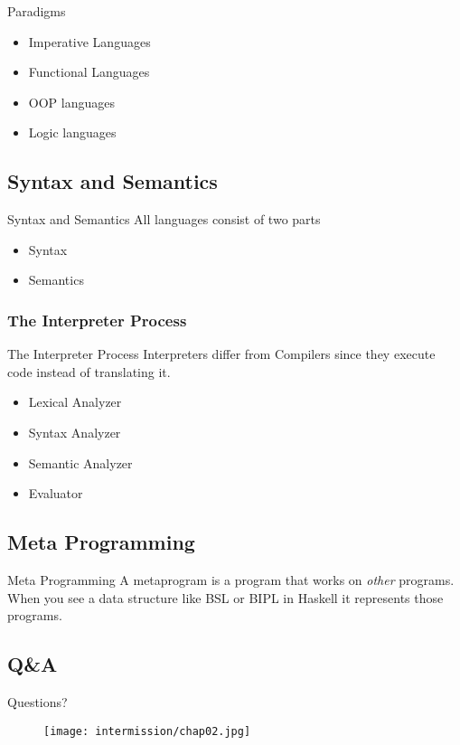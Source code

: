 \begin{frame}{Paradigms}
    \begin{itemize}[<+->]
        \item Imperative Languages
        \item Functional Languages
        \item OOP languages
        \item Logic languages
    \end{itemize}
\end{frame}

\subsection*{Syntax and Semantics}
\begin{frame}{Syntax and Semantics}
    All languages consist of two parts
    \begin{itemize}[<+->]
        \item Syntax
        \item Semantics
    \end{itemize}
\end{frame}

\subsubsection{The Interpreter Process}
\begin{frame}{The Interpreter Process}
    Interpreters differ from Compilers since they execute code instead of translating it.
    \begin{itemize}[<+->]
        \item Lexical Analyzer
        \item Syntax Analyzer
        \item Semantic Analyzer
        \item Evaluator
    \end{itemize}
\end{frame}

\subsection{Meta Programming}
\begin{frame}{Meta Programming}
    A metaprogram is a program that works on \textit{other} programs.\\
    When you see a data structure like BSL or BIPL in Haskell it represents those programs.
\end{frame}

\subsection*{Q\&A}
\begin{frame}{Questions?}
    \begin{figure}
        \centering
        \texttt{[image: intermission/chap02.jpg]}
    \end{figure}
\end{frame}